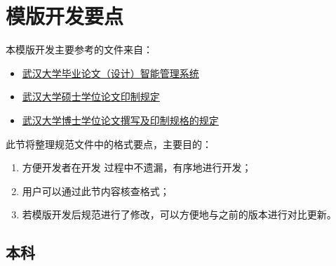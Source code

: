 

\section{模版开发要点}

本模版开发主要参考的文件来自：

\begin{itemize}
  \item \href{http://210.42.121.231/bysj/}{武汉大学毕业论文（设计）智能管理系统}
  \item \href{https://gs.whu.edu.cn/info/1022/3235.htm}{武汉大学硕士学位论文印制规定}
  \item \href{https://gs.whu.edu.cn/info/1022/3231.htm}{武汉大学博士学位论文撰写及印制规格的规定}
\end{itemize}

此节将整理规范文件中的格式要点，主要目的：

\begin{enumerate}
  \item 方便开发者在开发  过程中不遗漏，有序地进行开发；
  \item 用户可以通过此节内容核查格式；
  \item 若模版开发后规范进行了修改，可以方便地与之前的版本进行对比更新。
\end{enumerate}







\subsection{本科}

